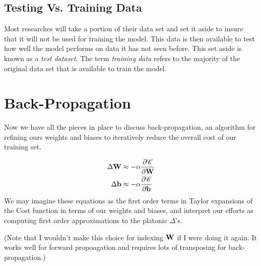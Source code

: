 \documentclass[twocolumn]{revtex4-1}
\newcommand{\bld}[1]{\vectorbold{#1}}
\begin{document}
\subsection{Testing Vs. Training Data}
Most researches will take a portion of their data set and set it aside to insure that it will not be used for training the model. This data is then available to test how well the model performs on data it has not seen before. This set aside is known as a \textit{test dataset}. The term \textit{training data} refers to the majority of the original data set that is available to train the model.

\section{Back-Propagation}
Now we have all the pieces in place to discuss back-propagation, an algorithm for refining ours weights and biases to iteratively reduce the overall cost of our training set. 

\begin{align}
    \label{eqn:deltas}
    \Delta \bld{W} & \approx - \alpha \frac{\partial \mathscr{C}}{\partial \bld{W}} \\
    \Delta \bld{b} & \approx - \alpha \frac{\partial \mathscr{C}}{\partial \bld{b}}
\end{align}
We may imagine these equations as the first order terms in Taylor expansions of the Cost function in terms of our weights and biases, and interpret our efforts as computing first order approximations to the platonic $\Delta$'s. 





(Note that I wouldn't make this choice for indexing $\bld{W}$ if I were doing it again. It works well for forward propoagation and requires lots of transposing for back-propagation.) 
\end{document}
